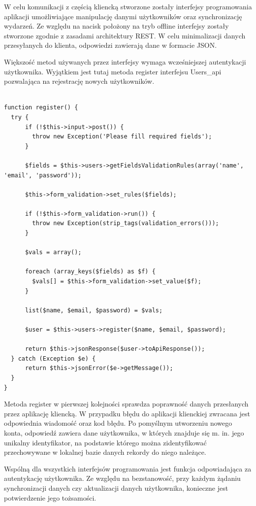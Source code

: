 W celu komunikacji z częścią kliencką stworzone zostały interfejsy programowania aplikacji umożliwiające manipulację danymi użytkowników oraz synchronizację wydarzeń. Ze względu na nacisk położony na tryb offline interfejsy zostały stworzone zgodnie z zasadami architektury REST. W celu minimalizacji danych przesyłanych do klienta, odpowiedzi zawierają dane w formacie JSON.

Większość metod używanych przez interfejsy wymaga wcześniejszej autentykacji użytkownika. Wyjątkiem jest tutaj metoda register interfejsu Users\_api pozwalająca na rejestrację nowych użytkowników.

\begin{lstlisting}[caption=Rejestracja użytkowników przy użyciu metody register interfejsu Users\_api., label=amb, captionpos=b]

function register() {
  try {
      if (!$this->input->post()) {
      	throw new Exception('Please fill required fields');
      }

      $fields = $this->users->getFieldsValidationRules(array('name', 'email', 'password'));

      $this->form_validation->set_rules($fields);

      if (!$this->form_validation->run()) {
      	throw new Exception(strip_tags(validation_errors()));
      }

      $vals = array();

      foreach (array_keys($fields) as $f) {
      	$vals[] = $this->form_validation->set_value($f);
      }

      list($name, $email, $password) = $vals;

      $user = $this->users->register($name, $email, $password);

      return $this->jsonResponse($user->toApiResponse());
  } catch (Exception $e) {
      return $this->jsonError($e->getMessage());
  }
}

\end{lstlisting}

Metoda register w pierwszej kolejności sprawdza poprawność danych przesłanych przez aplikację kliencką. W przypadku błędu do aplikacji klienckiej zwracana jest odpowiednia wiadomość oraz kod błędu. Po pomyślnym utworzeniu nowego konta, odpowiedź zawiera  dane użytkownika, w których znajduje się m. in. jego unikalny identyfikator, na podstawie którego można zidentyfikować przechowywane w lokalnej bazie danych rekordy do niego należące.

Wspólną dla wszystkich interfejsów programowania jest funkcja odpowiadająca za autentykację użytkownika. Ze względu na bezstanowość, przy każdym żądaniu synchronizacji danych czy aktualizacji danych użytkownika, konieczne jest potwierdzenie jego tożsamości.

